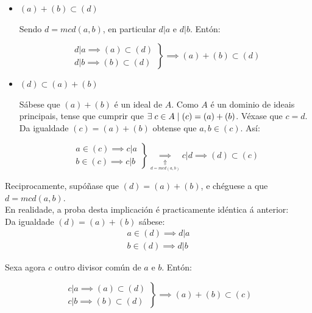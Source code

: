 \documentclass[twoside]{report}
\theoremstyle{mystyle}
\begin{document}
\begin{itemize}
    \item $(a) + (b) \subset (d)$
    
    Sendo $d = mcd(a,b)$, en particular $d|a$ e $d|b$. Entón:
    
    \[ 
    \left. \begin{array}{r} 
    d|a \implies (a) \subset (d)  \\[1ex]
    d|b \implies (b) \subset (d)
    \end{array} \right\}
    \implies (a) + (b) \subset (d)
    \]
    
    \item $(d) \subset (a) + (b)$
    
    Sábese que $(a) + (b)$ é un ideal de $A$. Como $A$ é un dominio de ideais principais, tense que cumprir que $\exists \hspace{1mm} c \in A \hspace{1mm} | \hspace{1mm} (c) = (a) + (b)$. Véxase que $c = d$.\\
    
    Da igualdade $(c) = (a) + (b)$ obtense que $a, b \in (c)$. Así:
    
    \[ 
    \left. \begin{array}{r} 
    a \in (c) \implies c|a  \\[1ex]
    b \in (c) \implies c|b
    \end{array} \right\}
    \underset{\underset{d = mcd(a,b)}{\Uparrow}}{\implies} c|d \implies (d) \subset (c)
    \]
    
\end{itemize}

\noindent {} Reciprocamente, supóñase que $(d) = (a) + (b)$, e chéguese a que $d = mcd(a,b)$.\\

\noindent En realidade, a proba desta implicación é practicamente idéntica á anterior:\\

\noindent Da igualdade $(d) = (a) + (b)$ sábese:
\begin{align*} %
a \in (d) \implies d|a\\
b \in (d) \implies d|b
\end{align*}

\noindent Sexa agora $c$ outro divisor común de $a$ e $b$. Entón:

    \[ 
    \left. \begin{array}{r} 
    c|a \implies (a) \subset (d)  \\[1ex]
    c|b \implies (b) \subset (d)
    \end{array} \right\}
    \implies (a) + (b) \subset (c)
    \]
    
\end{document}
